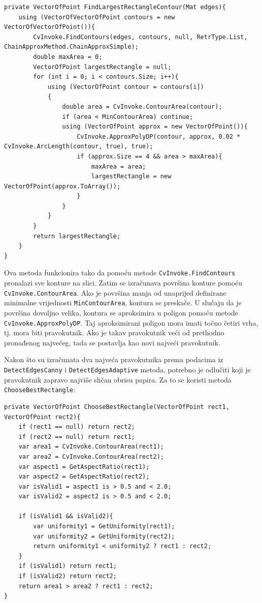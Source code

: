 \documentclass{foi}
\begin{document}
\pagebreak
\begin{lstlisting}[caption={Metoda za pronalazak najvećeg pravokutnika koji predstavlja papir}]
private VectorOfPoint FindLargestRectangleContour(Mat edges){
    using (VectorOfVectorOfPoint contours = new VectorOfVectorOfPoint()){
        CvInvoke.FindContours(edges, contours, null, RetrType.List, ChainApproxMethod.ChainApproxSimple);
        double maxArea = 0;
        VectorOfPoint largestRectangle = null;
        for (int i = 0; i < contours.Size; i++){
            using (VectorOfPoint contour = contours[i])
            {
                double area = CvInvoke.ContourArea(contour);
                if (area < MinContourArea) continue;
                using (VectorOfPoint approx = new VectorOfPoint()){
                    CvInvoke.ApproxPolyDP(contour, approx, 0.02 * CvInvoke.ArcLength(contour, true), true);
                    if (approx.Size == 4 && area > maxArea){
                        maxArea = area;
                        largestRectangle = new VectorOfPoint(approx.ToArray());
                    }
                }
            }
        }
        return largestRectangle;
    }
}
\end{lstlisting}

Ova metoda funkcionira tako da pomoću metode \texttt{CvInvoke.FindContours} pronalazi sve konture na slici. Zatim se izračunava površina konture pomoću \texttt{CvInvoke.ContourArea}. Ako je površina manja od unaprijed definirane minimalne vrijednosti \texttt{MinContourArea}, kontura se preskače. U slučaju da je površina dovoljno velika, kontura se aproksimira u poligon pomoću metode \texttt{CvInvoke.ApproxPolyDP}. Taj aproksimirani poligon mora imati točno četiri vrha, tj. mora biti pravokutnik. Ako je takav pravokutnik veći od prethodno pronađenog najvećeg, tada se postavlja kao novi najveći pravokutnik.


Nakon što su izračunata dva najveća pravokutnika prema podacima iz \texttt{DetectEdgesCanny} i \texttt{DetectEdgesAdaptive} metoda, potrebno je odlučiti koji je pravokutnik zapravo najviše sličan obrisu papira. Za to se koristi metoda \texttt{ChooseBestRectangle}:
\pagebreak
\begin{lstlisting}[caption={Metoda za odabir najboljeg pravokutnika}]
private VectorOfPoint ChooseBestRectangle(VectorOfPoint rect1, VectorOfPoint rect2){
    if (rect1 == null) return rect2;
    if (rect2 == null) return rect1;
    var area1 = CvInvoke.ContourArea(rect1);
    var area2 = CvInvoke.ContourArea(rect2);
    var aspect1 = GetAspectRatio(rect1);
    var aspect2 = GetAspectRatio(rect2);
    var isValid1 = aspect1 is > 0.5 and < 2.0;
    var isValid2 = aspect2 is > 0.5 and < 2.0;

    if (isValid1 && isValid2){
        var uniformity1 = GetUniformity(rect1);
        var uniformity2 = GetUniformity(rect2);
        return uniformity1 < uniformity2 ? rect1 : rect2;
    }
    if (isValid1) return rect1;
    if (isValid2) return rect2;
    return area1 > area2 ? rect1 : rect2;
}
\end{lstlisting}
\end{document}
